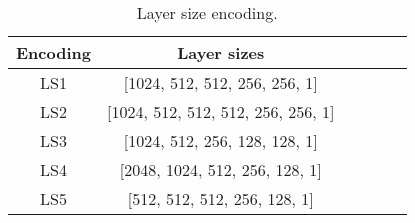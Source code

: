 \begin{table}[h]
    \caption{Layer size encoding.}\label{table:ls-encoding}
    \centering
    \small
    \begin{tabular}{cccccc}
        \hline
    \textbf{Encoding} & \textbf{Layer sizes} \\  \hline
        LS1 & [1024, 512, 512, 256, 256, 1] \\ 
        LS2 & [1024, 512, 512, 512, 256, 256, 1] \\
        LS3 & [1024, 512, 256, 128, 128, 1] \\
        LS4 & [2048, 1024, 512, 256, 128, 1] \\
        LS5 & [512, 512, 512, 256, 128, 1] \\ \hline
\end{tabular}
\end{table}

